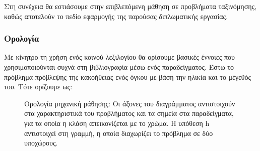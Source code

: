 Στη συνέχεια θα εστιάσουμε στην επιβλεπόμενη μάθηση σε προβλήματα ταξινόμησης, καθώς αποτελούν το πεδίο εφαρμογής της παρούσας διπλωματικής εργασίας.
 
\subsubsection{Ορολογία} \label{section:terminology}
 Με κίνητρο τη χρήση ενός κοινού λεξιλογίου θα ορίσουμε βασικές έννοιες που χρησιμοποιούνται συχνά στη βιβλιογραφία μέσω ενός παραδείγματος. Έστω το πρόβλημα πρόβλεψης της κακοήθειας ενός όγκου με βάση την ηλικία και το μέγεθός του. Τότε ορίζουμε ως:
 
\begin{figure}[!htb]
	\centering
	\caption[Ορολογία μηχανική μάθησης]{Ορολογία μηχανική μάθησης: Οι άξονες του διαγράμματος αντιστοιχούν στα χαρακτηριστικά του προβλήματος και τα σημεία στα παραδείγματα, για τα οποία η κλάση απεικονίζεται με το χρώμα. Η υπόθεση h αντιστοιχεί στη γραμμή, η οποία διαχωρίζει το πρόβλημα σε δύο υποχώρους.}	
	\label{fig:terminology}
\end{figure}

